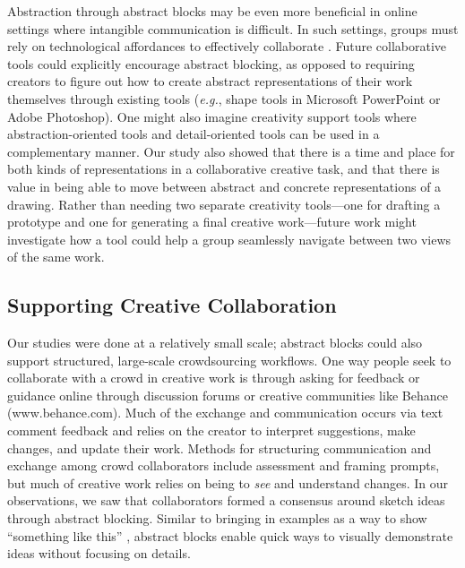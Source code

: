 Abstraction through abstract blocks may be even more beneficial in online settings where intangible communication is difficult. In such settings, groups must rely on technological affordances to effectively collaborate \cite{Hollan1992,Jensen2018}. 
Future collaborative tools could explicitly encourage abstract blocking, as opposed to requiring creators to figure out how to create abstract representations of their work themselves through existing tools (\textit{e.g.}, shape tools in Microsoft PowerPoint or Adobe Photoshop). 
One might also imagine creativity support tools where abstraction-oriented tools and detail-oriented tools can be used in a complementary manner. Our study also showed that there is a time and place for both kinds of representations in a collaborative creative task, and that there is value in being able to move between abstract and concrete representations of a drawing. Rather than needing two separate creativity tools---one for drafting a prototype and one for generating a final creative work---future work might investigate how a tool could help a group seamlessly navigate between two views of the same work.

\subsection{Supporting Creative Collaboration}
Our studies were done at a relatively small scale; abstract blocks could also support structured, large-scale crowdsourcing workflows. One way people seek to collaborate with a crowd in creative work is through asking for feedback or guidance online through discussion forums or creative communities \cite{kuznetsov2010rise,settles2013,wasko2005should} like Behance (www.behance.com). Much of the exchange and communication occurs via text comment feedback and relies on the creator to interpret suggestions, make changes, and update their work. Methods for structuring communication and exchange among crowd collaborators include assessment \cite{Dow2012} and framing \cite{hicks2016framing} prompts, but much of creative work relies on being to \textit{see} and understand changes. In our observations, we saw that collaborators formed a consensus around sketch ideas through abstract blocking. Similar to bringing in examples as a way to show ``something like this'' \cite{kang2018paragon}, abstract blocks enable quick ways to visually demonstrate ideas without focusing on details.

